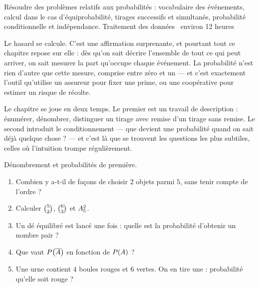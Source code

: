   {Résoudre des problèmes relatifs aux probabilités : vocabulaire des
   événements, calcul dans le cas d'équiprobabilité, tirages successifs et
   simultanés, probabilité conditionnelle et indépendance.}
  {Traitement des données \textbullet\ environ 12 heures}

Le hasard se calcule. C'est une affirmation surprenante, et pourtant tout ce
chapitre repose sur elle : dès qu'on sait décrire l'ensemble de tout ce qui
peut arriver, on sait mesurer la part qu'occupe chaque événement. La
probabilité n'est rien d'autre que cette mesure, comprise entre zéro et un —
et c'est exactement l'outil qu'utilise un assureur pour fixer une prime, ou
une coopérative pour estimer un risque de récolte.

Le chapitre se joue en deux temps. Le premier est un travail de description :
énumérer, dénombrer, distinguer un tirage avec remise d'un tirage sans remise.
Le second introduit le conditionnement — que devient une probabilité quand on
sait déjà quelque chose ? — et c'est là que se trouvent les questions les plus
subtiles, celles où l'intuition trompe régulièrement.

\begin{revision}
Dénombrement et probabilités de première.

\begin{enumerate}[label=\textbf{\arabic*.}, leftmargin=*, itemsep=0.35em]
  \item Combien y a-t-il de façons de choisir $2$ objets parmi $5$, sans tenir
        compte de l'ordre ?
  \item Calculer $\combi{2}{5}$, $\combi{3}{6}$ et $\arrang{2}{5}$.
  \item Un dé équilibré est lancé une fois : quelle est la probabilité
        d'obtenir un nombre pair ?
  \item Que vaut $\proba{\evtc{A}}$ en fonction de $\proba{A}$ ?
  \item Une urne contient $4$ boules rouges et $6$ vertes. On en tire une :
        probabilité qu'elle soit rouge ?
\end{enumerate}
\end{revision}

